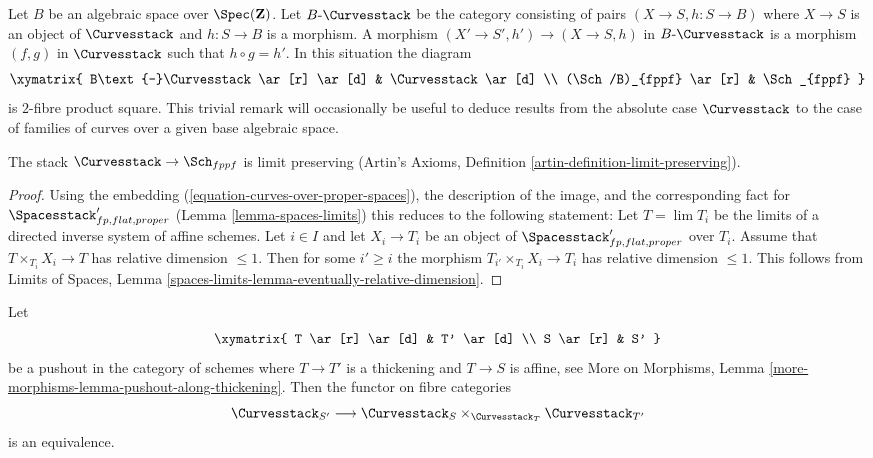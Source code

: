 \begin{remark}
\label{remark-curves-base-change}
Let $B$ be an algebraic space over $\Spec(\mathbf{Z})$.
Let $B\text{-}\Curvesstack$ be the category consisting
of pairs $(X \to S, h : S \to B)$
where $X \to S$ is an object of
$\Curvesstack$ and $h : S \to B$ is a morphism.
A morphism $(X' \to S', h') \to (X \to S, h)$
in $B\text{-}\Curvesstack$ is a morphism $(f, g)$
in $\Curvesstack$ such that $h \circ g = h'$.
In this situation the diagram
$$
\xymatrix{
B\text{-}\Curvesstack \ar[r] \ar[d] & \Curvesstack \ar[d] \\
(\Sch/B)_{fppf} \ar[r] & \Sch_{fppf}
}
$$
is $2$-fibre product square. This trivial remark
will occasionally be useful to deduce results from
the absolute case $\Curvesstack$ to the case
of families of curves over a given base algebraic space.
\end{remark}

\begin{lemma}
\label{lemma-curves-limits}
The stack $\Curvesstack \to \Sch_{fppf}$ is limit preserving
(Artin's Axioms, Definition \ref{artin-definition-limit-preserving}).
\end{lemma}

\begin{proof}
Using the embedding (\ref{equation-curves-over-proper-spaces}),
the description of the image, and
the corresponding fact for $\Spacesstack'_{fp, flat, proper}$
(Lemma \ref{lemma-spaces-limits})
this reduces to the following statement:
Let $T = \lim T_i$ be the limits of a
directed inverse system of affine schemes.
Let $i \in I$ and let $X_i \to T_i$ be an object of
$\Spacesstack'_{fp, flat, proper}$ over $T_i$.
Assume that $T \times_{T_i} X_i \to T$ has
relative dimension $\leq 1$.
Then for some $i' \geq i$ the morphism
$T_{i'} \times_{T_i} X_i \to T_i$ has
relative dimension $\leq 1$. This follows from
Limits of Spaces, Lemma
\ref{spaces-limits-lemma-eventually-relative-dimension}.
\end{proof}

\begin{lemma}
\label{lemma-curves-RS-star}
Let
$$
\xymatrix{
T \ar[r] \ar[d] & T' \ar[d] \\
S \ar[r] & S'
}
$$
be a pushout in the category of schemes where
$T \to T'$ is a thickening and $T \to S$ is affine, see
More on Morphisms, Lemma \ref{more-morphisms-lemma-pushout-along-thickening}.
Then the functor on fibre categories
$$
\Curvesstack_{S'}
\longrightarrow
\Curvesstack_S
\times_{\Curvesstack_T}
\Curvesstack_{T'}
$$
is an equivalence.
\end{lemma}

